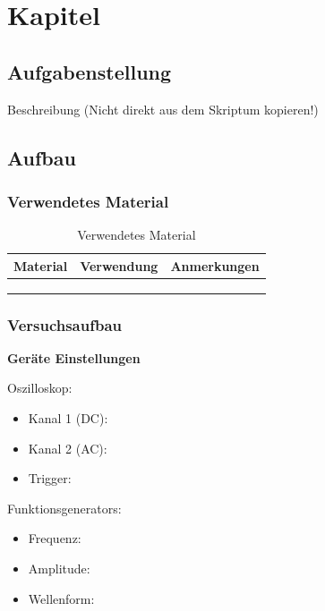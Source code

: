 \newpage
\section{Kapitel}\label{sec:1}

\subsection{Aufgabenstellung}\label{sec:1-1}

\begin{highlightblock}[Aufgabenbezeichnung]
Beschreibung (Nicht direkt aus dem Skriptum kopieren!)
\end{highlightblock}


\subsection{Aufbau}

\subsubsection{Verwendetes Material}

\begin{table}[h]
	\centering
	\caption{Verwendetes Material}
	\begin{tabularx}{\textwidth}{XXX}
		\textbf{Material} & \textbf{Verwendung} & \textbf{Anmerkungen}\\ \midrule
		& & \\
		& & \\
		& & \\
	\end{tabularx}	
\end{table}

\subsubsection{Versuchsaufbau}

\textbf{Geräte Einstellungen}

\begin{minipage}[t]{.48\textwidth}
	Oszilloskop:
	\begin{itemize}[noitemsep]
		\item Kanal 1 (DC):
		\item Kanal 2 (AC):
		\item Trigger:
	\end{itemize}
\end{minipage}\hfill
\begin{minipage}[t]{.48\textwidth}
	Funktionsgenerators:
	\begin{itemize}[noitemsep]
		\item Frequenz: 
		\item Amplitude: 
		\item Wellenform: 
	\end{itemize}
\end{minipage}

